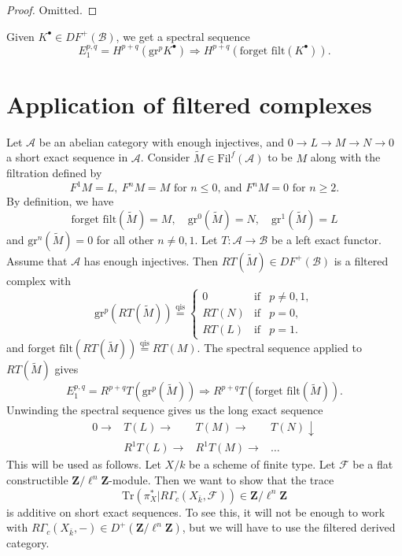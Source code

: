 \begin{proof}
Omitted.
\end{proof}

Given $K^\bullet \in DF^+(\mathcal{B})$, we get a spectral sequence
$$
E_1^{p, q} = H^{p+q}(\text{gr}^p K^\bullet) \Rightarrow H^{p+q}(\text{forget
filt}(K^\bullet)).
$$

\section{Application of filtered complexes}
\label{trace-section-applications-filtered}
Let $\mathcal{A}$ be an abelian category with enough injectives, and
$0 \to L \to M \to N \to 0$ a short exact sequence in $\mathcal{A}$.
Consider $\widetilde M \in \text{Fil}^f(\mathcal{A})$ to be $M$ along with the
filtration defined by
$$
F^1M = L, \ F^nM = M
\text{ for }n \leq 0\text{, and }F^nM = 0\text{ for }n \geq 2.
$$
By definition, we have
$$
\text{forget filt}(\widetilde M) = M, \quad
\text{gr}^0(\widetilde M) = N, \quad
\text{gr}^1(\widetilde M) = L
$$
and $\text{gr}^n(\widetilde M) = 0$ for all other $n \neq 0, 1$. Let $T:
\mathcal{A} \to \mathcal{B}$ be a left exact functor. Assume that $\mathcal{A}$
has enough injectives. Then $RT(\widetilde M) \in DF^+(\mathcal{B})$ is a
filtered complex with
$$
\text{gr}^p(RT(\widetilde M))
\stackrel{\text{qis}}{=}
\left\{
\begin{matrix}
0 & \text{if} & p \neq 0, 1, \\
RT(N) & \text{if} & p = 0, \\
RT(L) & \text{if} & p = 1.
\end{matrix}
\right.
$$
and $\text{forget filt}(RT(\widetilde M))\stackrel{\text{qis}}{ = } RT(M)$. The
spectral sequence applied to $RT(\widetilde M)$ gives
$$
E_1^{p, q} = R^{p+q}T(\text{gr}^p(\widetilde M)) \Rightarrow
R^{p+q}T(\text{forget filt}(\widetilde M)).
$$
Unwinding the spectral sequence gives us the long exact sequence
$$
\begin{array}{cccc}0 \longrightarrow & T(L) \longrightarrow & T(M) \longrightarrow & T(N) \downarrow \\  & R^1T(L) \longrightarrow & R^1T(M) \longrightarrow & \ldots\end{array}
$$
This will be used as follows. Let $X/k$ be a scheme of finite type. Let
$\mathcal{F}$ be a flat constructible $\mathbf{Z}/\ell^n \mathbf{Z}$-module.
Then we want to show that the trace
$$
\text{Tr}( \pi_X^\ast | R\Gamma_c(X_{\bar k}, \mathcal{F})) \in
\mathbf{Z}/\ell^n \mathbf{Z}
$$
is additive on short exact sequences. To see this, it will not be enough to
work with $R\Gamma_c(X_{\bar k}, -) \in D^+(\mathbf{Z}/\ell^n \mathbf{Z})$, but
we will have to use the filtered derived category.


